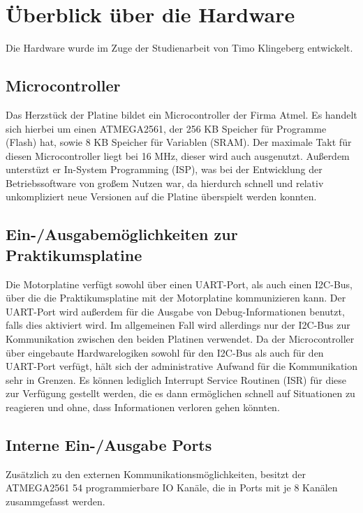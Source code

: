 \chapter{Überblick über die Hardware}

Die Hardware wurde im Zuge der Studienarbeit von Timo Klingeberg \cite{STUD_TIMO}
entwickelt.
\section{Microcontroller}
Das Herzstück der Platine bildet ein Microcontroller der Firma Atmel.
Es handelt sich hierbei um einen ATMEGA2561\cite{ATMEGA_MANUAL}, der 256 KB Speicher für
Programme (Flash) hat, sowie 8 KB Speicher für Variablen (SRAM). Der maximale Takt für
diesen Microcontroller liegt bei 16 MHz, dieser wird auch ausgenutzt. Außerdem unterstüzt
er In-System Programming (ISP), was bei der Entwicklung der Betriebssoftware von großem
Nutzen war, da hierdurch schnell und relativ unkompliziert neue Versionen auf die Platine
überspielt werden konnten.
\section{Ein-/Ausgabemöglichkeiten zur Praktikumsplatine}
Die Motorplatine verfügt sowohl über einen UART-Port, als auch einen I2C-Bus, über die
die Praktikumsplatine mit der Motorplatine kommunizieren kann. Der UART-Port wird außerdem
für die Ausgabe von Debug-Informationen benutzt, falls dies aktiviert wird. Im allgemeinen
Fall wird allerdings nur der I2C-Bus zur Kommunikation zwischen den beiden Platinen verwendet.
Da der Microcontroller über eingebaute Hardwarelogiken sowohl für den I2C-Bus als auch für
den UART-Port verfügt, hält sich der administrative Aufwand für die Kommunikation sehr in
Grenzen. Es können lediglich Interrupt Service Routinen (ISR) für diese zur Verfügung gestellt
werden, die es dann ermöglichen schnell auf Situationen zu reagieren und ohne, dass
Informationen verloren gehen könnten.
\section{Interne Ein-/Ausgabe Ports}
Zusätzlich zu den externen Kommunikationsmöglichkeiten, besitzt der ATMEGA2561 54
programmierbare IO Kanäle, die in Ports mit je 8 Kanälen zusammgefasst werden.
